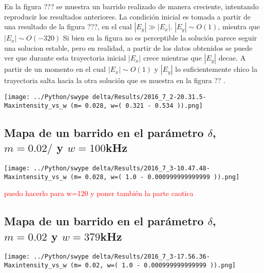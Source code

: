 			
				En la figura ??? se muestra un barrido realizado de manera creciente, intentando reproducir los resultados anteriores.
				La condición inicial es tomada a partir de una resultado de la figura ???, en el cual $|E_y| \gg |E_x|$. 
				$|E_y|\sim O(1)$,  mientra que  $|E_x| \sim O(-320)$
				Si bien en la figura no es perceptible la solución parece seguir una solucion estable, pero en realidad, a partir de los datos obtenidos se puede ver que durante esta trayectoria inicial $|E_x|$ crece mientras que $|E_y|$ decae. A partir de un momento en el cual $|E_x| \sim O(1)$ y $|E_y|$ lo suficientemente chico la trayectoria salta hacia la otra solución que es muestra en la figura ?? .
				
				\begin{minipage}{0.6\textwidth}
					\centering
					\texttt{[image: ../Python/swype delta/Results/2016\_7\_2-20.31.5-Maxintensity\_vs\_w (m= 0.028, w=( 0.321 - 0.534 )).png]}
				\end{minipage}	
		
		
	\subsection{Mapa de un barrido en el parámetro $\delta$, $m=0.02/$ y $w=100$kHz}
		
			\begin{minipage}{0.6\textwidth}
				\centering
				\texttt{[image: ../Python/swype delta/Results/2016\_7\_3-10.47.48-Maxintensity\_vs\_w (m= 0.028, w=( 1.0 - 0.000999999999999 )).png]}
			\end{minipage}
		\textcolor{red}{puedo hacerlo para w=120 y poner también la parte caotica}
				

		\subsection{Mapa de un barrido en el parámetro $\delta$, $m=0.02$ y $w=379$kHz}
				
				\begin{minipage}{0.6\textwidth}
					\centering
					\texttt{[image: ../Python/swype delta/Results/2016\_7\_3-17.56.36-Maxintensity\_vs\_w (m= 0.02, w=( 1.0 - 0.000999999999999 )).png]}
				\end{minipage}	
				